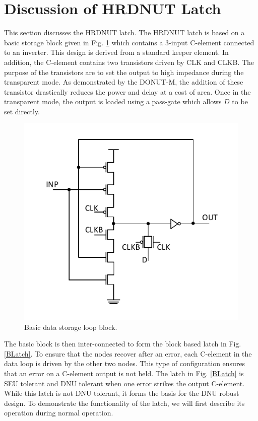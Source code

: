 \section{Discussion of HRDNUT Latch} \label{Proposed}

This section discusses the HRDNUT latch. The HRDNUT latch is based on a basic storage block given in Fig. \ref{Block} which contains a 3-input C-element connected to an inverter. This design is derived from a standard keeper element. In addition, the C-element contains two transistors driven by CLK and CLKB. The purpose of the transistors are to set the output to high impedance during the transparent mode. As demonstrated by the DONUT-M, the addition of these transistor drastically reduces the power and delay at a cost of area. Once in the transparent mode, the output is loaded using a pass-gate which allows $D$ to be set directly.     

\begin{figure}[h]
	\centering
	\includegraphics[width=0.5\linewidth]{Figures/Block}
	\caption{Basic data storage loop block.}
	\label{Block}
\end{figure} 

The basic block is then inter-connected to form the block based latch in Fig. \ref{BLatch}. To ensure that the nodes recover after an error, each C-element in the data loop is driven by the other two nodes. This type of configuration ensures that an error on a C-element output is not held. The latch in Fig. \ref{BLatch} is SEU tolerant and DNU tolerant when one error strikes the output C-element. While this latch is not DNU tolerant, it forms the basis for the DNU robust design. To demonstrate the functionality of the latch, we will first describe its operation during normal operation.


